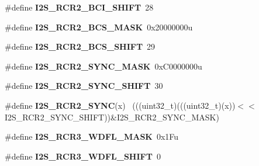 \begin{DoxyCompactItemize}
\item 
\hypertarget{group___i2_s___register___masks_gae2c819f98fdcd09a87ed34dd47b5fb4b}{}\#define {\bfseries I2\+S\+\_\+\+R\+C\+R2\+\_\+\+B\+C\+I\+\_\+\+S\+H\+I\+F\+T}~28\label{group___i2_s___register___masks_gae2c819f98fdcd09a87ed34dd47b5fb4b}

\item 
\hypertarget{group___i2_s___register___masks_gae4983d1c1366069cf6e768f5fefe84ff}{}\#define {\bfseries I2\+S\+\_\+\+R\+C\+R2\+\_\+\+B\+C\+S\+\_\+\+M\+A\+S\+K}~0x20000000u\label{group___i2_s___register___masks_gae4983d1c1366069cf6e768f5fefe84ff}

\item 
\hypertarget{group___i2_s___register___masks_gaad737555e622d9b49f092a83f4e7ea85}{}\#define {\bfseries I2\+S\+\_\+\+R\+C\+R2\+\_\+\+B\+C\+S\+\_\+\+S\+H\+I\+F\+T}~29\label{group___i2_s___register___masks_gaad737555e622d9b49f092a83f4e7ea85}

\item 
\hypertarget{group___i2_s___register___masks_gaf1a919e7fd69cca38a1454b2883fc0f0}{}\#define {\bfseries I2\+S\+\_\+\+R\+C\+R2\+\_\+\+S\+Y\+N\+C\+\_\+\+M\+A\+S\+K}~0x\+C0000000u\label{group___i2_s___register___masks_gaf1a919e7fd69cca38a1454b2883fc0f0}

\item 
\hypertarget{group___i2_s___register___masks_ga9bb530a10a74f4c58a1866ba1d62fedd}{}\#define {\bfseries I2\+S\+\_\+\+R\+C\+R2\+\_\+\+S\+Y\+N\+C\+\_\+\+S\+H\+I\+F\+T}~30\label{group___i2_s___register___masks_ga9bb530a10a74f4c58a1866ba1d62fedd}

\item 
\hypertarget{group___i2_s___register___masks_ga24bcf66ef68374a56756bb5fbb6bc89d}{}\#define {\bfseries I2\+S\+\_\+\+R\+C\+R2\+\_\+\+S\+Y\+N\+C}(x)                                              ~(((uint32\+\_\+t)(((uint32\+\_\+t)(x))$<$$<$I2\+S\+\_\+\+R\+C\+R2\+\_\+\+S\+Y\+N\+C\+\_\+\+S\+H\+I\+F\+T))\&I2\+S\+\_\+\+R\+C\+R2\+\_\+\+S\+Y\+N\+C\+\_\+\+M\+A\+S\+K)\label{group___i2_s___register___masks_ga24bcf66ef68374a56756bb5fbb6bc89d}

\item 
\hypertarget{group___i2_s___register___masks_gab98b46b5057b2fd18a0fefb93eb20450}{}\#define {\bfseries I2\+S\+\_\+\+R\+C\+R3\+\_\+\+W\+D\+F\+L\+\_\+\+M\+A\+S\+K}~0x1\+Fu\label{group___i2_s___register___masks_gab98b46b5057b2fd18a0fefb93eb20450}

\item 
\hypertarget{group___i2_s___register___masks_gaab28291891b0e5ced36d580cef82982d}{}\#define {\bfseries I2\+S\+\_\+\+R\+C\+R3\+\_\+\+W\+D\+F\+L\+\_\+\+S\+H\+I\+F\+T}~0\label{group___i2_s___register___masks_gaab28291891b0e5ced36d580cef82982d}


\end{DoxyCompactItemize}
